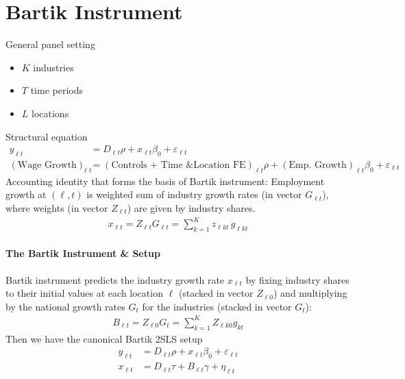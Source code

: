 \documentclass[12pt]{article}
\theoremstyle{plain}
\theoremstyle{definition}
\theoremstyle{remark}
\begin{document}
\clearpage
\section{Bartik Instrument}

General panel setting
\begin{itemize}
  \item $K$ industries
  \item $T$ time periods
  \item $L$ locations
\end{itemize}
Structural equation
\begin{align*}
  y_{\ell t}
  &=
  D_{\ell t}
  \rho
  +
  x_{\ell t}\beta_0
  +
  \varepsilon_{\ell t}
  \\
  (\text{Wage Growth})_{\ell t}
  &=
  (\text{Controls + Time \& Location FE})_{\ell t}
  \rho
  +
  (\text{Emp. Growth})_{\ell t}\beta_0
  +
  \varepsilon_{\ell t}
\end{align*}
Accounting identity that forms the basis of Bartik instrument:
Employment growth at $(\ell,t)$ is weighted sum of industry growth rates
(in vector $G_{\ell t}$), where weights (in vector $Z_{\ell t}$) are
given by industry shares.
\begin{align*}
  x_{\ell t}
  =
  Z_{\ell t}
  G_{\ell t}
  =
  \sum_{k=1}^K
  z_{\ell k t} \, g_{\ell k t}
\end{align*}
\paragraph{The Bartik Instrument \& Setup}
Bartik instrument predicts the industry growth rate $x_{\ell t}$
by fixing industry shares to their initial values at each location
$\ell$ (stacked in vector $Z_{\ell 0}$) and multiplying by the national
growth rates $G_t$ for the industries (stacked in vector $G_t$):
\begin{align*}
  B_{\ell t}
  =
  Z_{\ell 0} G_t
  =
  \sum_{k=1}^K
  Z_{\ell k 0} g_{kt}
\end{align*}
Then we have the canonical Bartik 2SLS setup
\begin{align*}
  y_{\ell t}
  &=
  D_{\ell t}
  \rho
  +
  x_{\ell t}\beta_0
  +
  \varepsilon_{\ell t}
  \\
  x_{\ell t}
  &=
  D_{\ell t}\tau
  +
  B_{\ell t}
  \gamma
  +
  \eta_{\ell t}
\end{align*}
\end{document}
